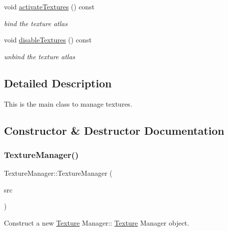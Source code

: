 \begin{DoxyCompactItemize}
\mbox{\label{class_texture_manager_ac5a208f43efcf71f5b54256282f09456}} 
void \hyperlink{class_texture_manager_ac5a208f43efcf71f5b54256282f09456}{activate\+Textures} () const
\begin{DoxyCompactList}\small\item\em bind the texture atlas \end{DoxyCompactList}\item 
\mbox{\label{class_texture_manager_a9039eebe1fcf0dbfeb0bd14fa2444348}} 
void \hyperlink{class_texture_manager_a9039eebe1fcf0dbfeb0bd14fa2444348}{disable\+Textures} () const
\begin{DoxyCompactList}\small\item\em unbind the texture atlas \end{DoxyCompactList}\end{DoxyCompactItemize}


\subsection{Detailed Description}
This is the main class to manage textures. 

\subsection{Constructor \& Destructor Documentation}
\mbox{\label{class_texture_manager_a724699d0481a6623a1dce39f5b883b0b}} 
\subsubsection{\texorpdfstring{Texture\+Manager()}{TextureManager()}}
{\footnotesize\ttfamily Texture\+Manager\+::\+Texture\+Manager (\begin{DoxyParamCaption}\item[{\hyperlink{class_texture_manager}{Texture\+Manager} const \&}]{src }\end{DoxyParamCaption})}



Construct a new \hyperlink{struct_texture}{Texture} Manager\+:\+: \hyperlink{struct_texture}{Texture} Manager object. 


